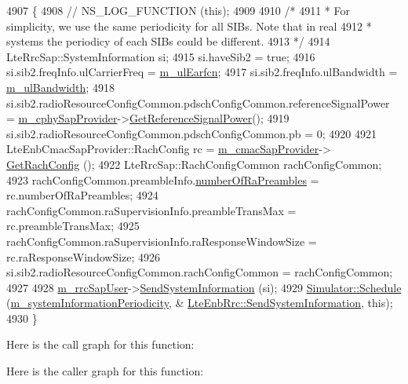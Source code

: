 \begin{DoxyCode}
4907 \{
4908   \textcolor{comment}{// NS\_LOG\_FUNCTION (this);}
4909 
4910   \textcolor{comment}{/*}
4911 \textcolor{comment}{   * For simplicity, we use the same periodicity for all SIBs. Note that in real}
4912 \textcolor{comment}{   * systems the periodicy of each SIBs could be different.}
4913 \textcolor{comment}{   */}
4914   LteRrcSap::SystemInformation si;
4915   si.haveSib2 = \textcolor{keyword}{true};
4916   si.sib2.freqInfo.ulCarrierFreq = \hyperlink{classns3_1_1LteEnbRrc_a34f34f9748426411f1027d0550dbe2c0}{m\_ulEarfcn};
4917   si.sib2.freqInfo.ulBandwidth = \hyperlink{classns3_1_1LteEnbRrc_a72fae86a1a284d181d9b977bf0201ed0}{m\_ulBandwidth};
4918   si.sib2.radioResourceConfigCommon.pdschConfigCommon.referenceSignalPower = 
      \hyperlink{classns3_1_1LteEnbRrc_ad0011468217726419587089658cd7352}{m\_cphySapProvider}->\hyperlink{classns3_1_1LteEnbCphySapProvider_aefd1a9a93163ebf27300f82cd1aeca00}{GetReferenceSignalPower}();
4919   si.sib2.radioResourceConfigCommon.pdschConfigCommon.pb = 0;
4920 
4921   LteEnbCmacSapProvider::RachConfig rc = \hyperlink{classns3_1_1LteEnbRrc_ae5bd011924ef4e221d19d705d6663e8b}{m\_cmacSapProvider}->
      \hyperlink{classns3_1_1LteEnbCmacSapProvider_a12632261a38a19676a1853bba76cea24}{GetRachConfig} ();
4922   LteRrcSap::RachConfigCommon rachConfigCommon;
4923   rachConfigCommon.preambleInfo.\hyperlink{structns3_1_1LteEnbCmacSapProvider_1_1RachConfig_aaf2f9cefb4961854d40da9b4321d5c8d}{numberOfRaPreambles} = rc.numberOfRaPreambles;
4924   rachConfigCommon.raSupervisionInfo.preambleTransMax = rc.preambleTransMax;
4925   rachConfigCommon.raSupervisionInfo.raResponseWindowSize = rc.raResponseWindowSize;
4926   si.sib2.radioResourceConfigCommon.rachConfigCommon = rachConfigCommon;
4927 
4928   \hyperlink{classns3_1_1LteEnbRrc_a7bbf35518d70915fcd24d68a835fe6af}{m\_rrcSapUser}->\hyperlink{classns3_1_1LteEnbRrcSapUser_a782ee98104b3d876b498dfd65214e707}{SendSystemInformation} (si);
4929   \hyperlink{classns3_1_1Simulator_a671882c894a08af4a5e91181bf1eec13}{Simulator::Schedule} (\hyperlink{classns3_1_1LteEnbRrc_a9f7be69996d0a982b8ae5129c0c3b1af}{m\_systemInformationPeriodicity}, &
      \hyperlink{classns3_1_1LteEnbRrc_a1b65dfc2b14c899003aa0bd4c50b957f}{LteEnbRrc::SendSystemInformation}, \textcolor{keyword}{this});
4930 \}
\end{DoxyCode}


Here is the call graph for this function\+:




Here is the caller graph for this function\+:



